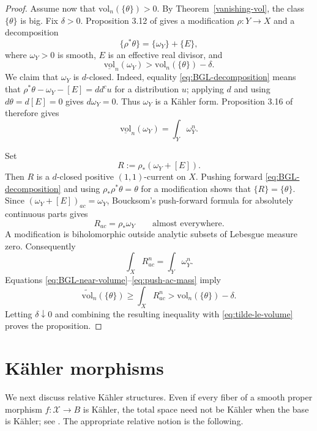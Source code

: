 \documentclass[11pt,letterpaper]{amsart}
\numberwithin{equation}{section}
\newcommand{\cal}{\mathcal}
\def\cX{{\cal X}}
\begin{document}
\begin{proof}
Assume now that $\mathrm{vol}_n(\{\theta\})>0$. By
Theorem~\ref{vanishing-vol}, the class $\{\theta\}$ is big. Fix $\delta>0$.
Proposition 3.12 of \cite{BGL} gives a modification $\rho:Y\to X$ and a
decomposition
\begin{equation}\label{eq:BGL-decomposition}
 \{\rho^*\theta\}=\{\omega_Y\}+\{E\},
\end{equation}
where $\omega_Y>0$ is smooth, $E$ is an effective real divisor, and
\begin{equation}\label{eq:BGL-near-volume}
 \underline{\mathrm{vol}}_n(\omega_Y)
 >\mathrm{vol}_n(\{\theta\})-\delta.
\end{equation}
We claim that $\omega_Y$ is $d$-closed. Indeed, equality
\eqref{eq:BGL-decomposition} means that
$\rho^*\theta-\omega_Y-[E]=dd^cu$ for a distribution $u$; applying $d$ and
using $d\theta=d[E]=0$ gives $d\omega_Y=0$. Thus $\omega_Y$ is a K\"ahler
form. Proposition 3.16 of \cite{BGL} therefore gives
\begin{equation}\label{eq:omegaY-volume}
 \underline{\mathrm{vol}}_n(\omega_Y)=\int_Y\omega_Y^n.
\end{equation}

Set
\[
 R:=\rho_*(\omega_Y+[E]).
\]
Then $R$ is a $d$-closed positive $(1,1)$-current on $X$. Pushing forward
\eqref{eq:BGL-decomposition} and using $\rho_*\rho^*\theta=\theta$ for a
modification shows that $\{R\}=\{\theta\}$. Since
$(\omega_Y+[E])_{ac}=\omega_Y$, Boucksom's
push-forward formula for absolutely continuous parts
\cite[Proposition 2.2]{Bou} gives
\[
 R_{ac}=\rho_*\omega_Y\qquad\text{almost everywhere}.
\]
A modification is biholomorphic outside analytic subsets of Lebesgue measure
zero. Consequently
\begin{equation}\label{eq:push-ac-mass}
 \int_XR_{ac}^n=\int_Y\omega_Y^n.
\end{equation}
Equations \eqref{eq:BGL-near-volume}--\eqref{eq:push-ac-mass} imply
\[
 \widetilde{\mathrm{vol}}_n(\{\theta\})
 \ge\int_XR_{ac}^n
 >\mathrm{vol}_n(\{\theta\})-\delta.
\]
Letting $\delta\downarrow0$ and combining the resulting inequality with \eqref{eq:tilde-le-volume} proves the proposition.
\end{proof}


\section{K\"ahler morphisms}

We next discuss relative K\"ahler structures. Even if every fiber of a smooth proper morphism $f:\cX\to B$ is K\"ahler, the total space need not be K\"ahler when the base is K\"ahler; see \cite[Example 3.9]{Big2}. The appropriate relative notion is the following.
\end{document}
